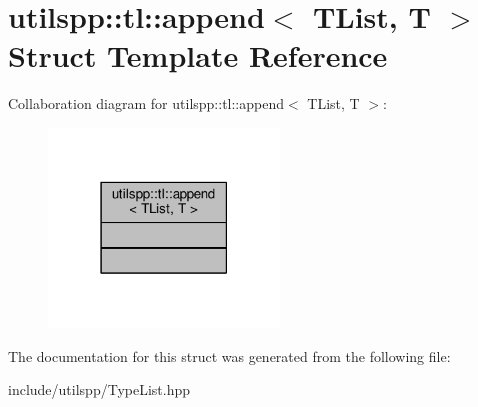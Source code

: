 \hypertarget{structutilspp_1_1tl_1_1append}{\section{utilspp\-:\-:tl\-:\-:append$<$ T\-List, T $>$ Struct Template Reference}
\label{structutilspp_1_1tl_1_1append}
}


Collaboration diagram for utilspp\-:\-:tl\-:\-:append$<$ T\-List, T $>$\-:
\nopagebreak
\begin{figure}[H]
\begin{center}
\leavevmode
\includegraphics[width=174pt]{structutilspp_1_1tl_1_1append__coll__graph}
\end{center}
\end{figure}


The documentation for this struct was generated from the following file\-:\begin{DoxyCompactItemize}
\item 
include/utilspp/Type\-List.\-hpp\end{DoxyCompactItemize}
